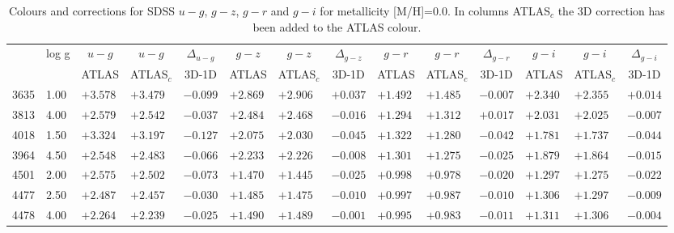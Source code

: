 \documentclass[]{aa}
\def\teff{$T\rm_{eff}$}
\begin{document}
\begin{appendix}
\begin{table*}
\caption{\label{SDSS_1_m00}
Colours and corrections for  SDSS $u-g$, $g-z$, $g-r$ and $g-i$ for metallicity [M/H]=0.0. In columns ATLAS$_c$ the 3D correction
has been added to the ATLAS colour.  }
\renewcommand{\tabcolsep}{3pt}
\tabskip=0pt
\begin{center}
\begin{tabular}{llllllllllllll}
\hline\noalign{\smallskip}
\multicolumn{1}{c}{\teff} & 
\multicolumn{1}{c}{log g} & 
\multicolumn{1}{c}{$u-g$} &
\multicolumn{1}{c}{$u-g$} &
\multicolumn{1}{c}{$\Delta_{u-g}$} &
\multicolumn{1}{c}{$g-z$} &
\multicolumn{1}{c}{$g-z$} &
\multicolumn{1}{c}{$\Delta_{g-z}$} &
\multicolumn{1}{c}{$g-r$} &
\multicolumn{1}{c}{$g-r$} &
\multicolumn{1}{c}{$\Delta_{g-r}$} & 
\multicolumn{1}{c}{$g-i$} &
\multicolumn{1}{c}{$g-i$} &
\multicolumn{1}{c}{$\Delta_{g-i}$} \\
\multicolumn{2}{c}{ } &  
\multicolumn{1}{c}{ATLAS} &
\multicolumn{1}{c}{ATLAS$_c$}&
\multicolumn{1}{c}{3D-1D}&
\multicolumn{1}{c}{ATLAS} &
\multicolumn{1}{c}{ATLAS$_c$}&
\multicolumn{1}{c}{3D-1D}&
\multicolumn{1}{c}{ATLAS} &
\multicolumn{1}{c}{ATLAS$_c$}&
\multicolumn{1}{c}{3D-1D}&
\multicolumn{1}{c}{ATLAS} &
\multicolumn{1}{c}{ATLAS$_c$}&
\multicolumn{1}{c}{3D-1D} \\
\hline\noalign{\smallskip}
\hline\noalign{\smallskip}
3635  &1.00 & $+3.578$ & $+3.479$ & $-0.099$ & $+2.869$ & $+2.906$ & $+0.037$ & $+1.492$ & $+1.485$ & $-0.007$ & $+2.340$ & $+2.355$ & $+0.014$ \\
3813  &4.00 & $+2.579$ & $+2.542$ & $-0.037$ & $+2.484$ & $+2.468$ & $-0.016$ & $+1.294$ & $+1.312$ & $+0.017$ & $+2.031$ & $+2.025$ & $-0.007$ \\
4018  &1.50 & $+3.324$ & $+3.197$ & $-0.127$ & $+2.075$ & $+2.030$ & $-0.045$ & $+1.322$ & $+1.280$ & $-0.042$ & $+1.781$ & $+1.737$ & $-0.044$ \\
3964  &4.50 & $+2.548$ & $+2.483$ & $-0.066$ & $+2.233$ & $+2.226$ & $-0.008$ & $+1.301$ & $+1.275$ & $-0.025$ & $+1.879$ & $+1.864$ & $-0.015$ \\
4501  &2.00 & $+2.575$ & $+2.502$ & $-0.073$ & $+1.470$ & $+1.445$ & $-0.025$ & $+0.998$ & $+0.978$ & $-0.020$ & $+1.297$ & $+1.275$ & $-0.022$ \\
4477  &2.50 & $+2.487$ & $+2.457$ & $-0.030$ & $+1.485$ & $+1.475$ & $-0.010$ & $+0.997$ & $+0.987$ & $-0.010$ & $+1.306$ & $+1.297$ & $-0.009$ \\
4478  &4.00 & $+2.264$ & $+2.239$ & $-0.025$ & $+1.490$ & $+1.489$ & $-0.001$ & $+0.995$ & $+0.983$ & $-0.011$ & $+1.311$ & $+1.306$ & $-0.004$ \\

\end{tabular}
\end{center}
\end{table*}
\end{appendix}
\end{document}
